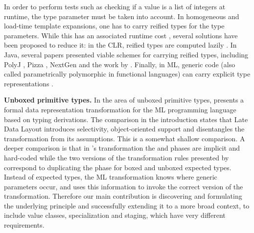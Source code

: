 In order to perform tests such as checking if a value is a list of integers at runtime, the type parameter must be taken into account. In homogeneous and load-time template expansions, one has to carry reified types for the type parameters. While this has an associated runtime cost \cite{michel-thesis}, several solutions have been proposed to reduce it: in the CLR, reified types are computed lazily \cite{dot-net-generics}. In Java, several papers presented viable schemes for carrying reified types, including PolyJ \cite{myers-polyj}, Pizza \cite{pizza}, NextGen \cite{cartwright-nextgen} and the work by  \cite{viroli-reflective}. Finally, in ML, generic code (also called parametrically polymorphic in functional languages) can carry explicit type representations \cite{harper-intensional-type-analysis, tarditi-til}.

\textbf{Unboxed primitive types.} In the area of unboxed primitive types,  \cite{leroy-unboxed-objects} presents a formal data representation transformation for the ML programming language based on typing derivations. The comparison in the introduction states that Late Data Layout introduces selectivity, object-oriented support and disentangles the transformation from its assumptions. This is a somewhat shallow comparison. A deeper comparison is that in 's transformation the \inject{} and \commit{} phases are implicit and hard-coded while the two versions of the transformation rules presented by  correspond to duplicating the \coerce{} phase for boxed and unboxed expected types. Instead of expected types, the ML transformation knows where generic parameters occur, and uses this information to invoke the correct version of the transformation. Therefore our main contribution is discovering and formulating the underlying principle and successfully extending it to a more broad context, to include value classes, specialization and staging, which have very different requirements.

